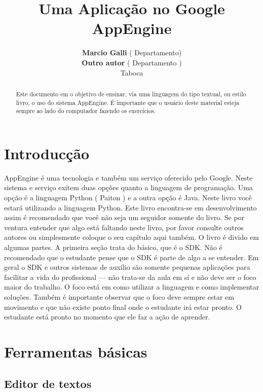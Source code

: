 \documentclass[a4paper]{article}
\title{Uma Aplicação no Google AppEngine}
\author{\textbf{Marcio Galli} ( Departamento)\\
        \textbf{Outro autor} ( Departamento )\\
        Taboca}
\begin{document}
\maketitle
\begin{abstract}
Este documento em o objetivo de ensinar, via uma linguagem do tipo textual, ou estilo livro, o uso do sistema AppEngine. É importante que o usuário deste material esteja sempre ao lado do computador fazendo os exercícios. 
\end{abstract}
\tableofcontents



\section{Introduc\c{c}\~{a}o}

AppEngine é uma tecnologia e também um serviço oferecido pelo Google. Neste sistema e serviço exitem duas opções quanto a linguagem de programação. Uma opção é a linguagem Python ( Paiton ) e a outra opção é Java. Neste livro você estará utilizando a linguagem Python. Este livro encontra-se em desenvolvimento assim é recomendado que você não seja um seguidor somente do livro. Se por ventura entender que algo está faltando neste livro, por favor consulte outros autores ou simplesmente coloque o seu capítulo aqui também. O livro é divido em algumas partes. A primeira seção trata do básico, que é o SDK. Não é recomendado que o estudante pense que o SDK é parte de algo a se entender. Em geral o SDK e outros sistemas de auxílio são somente pequenas aplicações para facilitar a vida do profissional --- não trata-se da aula em sí e não deve ser o foco maior do trabalho. O foco está em como utilizar a linguagem e como implementar soluções. Também é importante observar que o foco deve sempre estar em movimento e que não existe ponto final onde o estudante irá estar pronto. O estudante está pronto no momento que ele faz a ação de aprender.


\section{Ferramentas básicas}

\subsection{Editor de textos}
\end{document}
